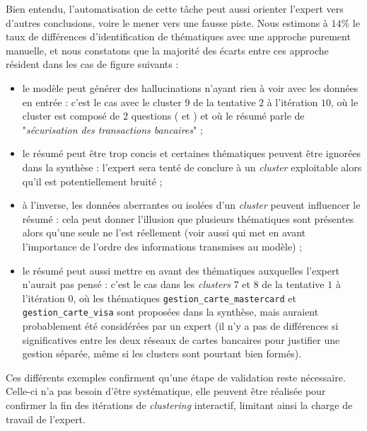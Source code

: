 			Bien entendu, l'automatisation de cette tâche peut aussi orienter l'expert vers d'autres conclusions, voire le mener vers une fausse piste.
			Nous estimons à $14$\% le taux de différences d'identification de thématiques avec une approche purement manuelle, et nous constatons que la majorité des écarts entre ces approche résident dans les cas de figure suivants :
			\begin{itemize}
				\item le modèle peut générer des hallucinations n'ayant rien à voir avec les données en entrée : c'est le cas avec le cluster $9$ de la tentative $2$ à l'itération $10$, où le cluster est composé de $2$ questions ( et ) et où le résumé parle de "\textit{sécurisation des transactions bancaires}" ;
				\item le résumé peut être trop concis et certaines thématiques peuvent être ignorées dans la synthèse : l'expert sera tenté de conclure à un \textit{cluster} exploitable alors qu'il est potentiellement bruité ;
				\item à l'inverse, les données aberrantes ou isolées d'un \textit{cluster} peuvent influencer le résumé : cela peut donner l'illusion que plusieurs thématiques sont présentes alors qu'une seule ne l'est réellement (voir aussi \cite{falke-etal:2019:ranking-generated-summaries} qui met en avant l'importance de l'ordre des informations transmises au modèle) ;
				\item le résumé peut aussi mettre en avant des thématiques auxquelles l'expert n'aurait pas pensé : c'est le cas dans les \textit{clusters} $7$ et $8$ de la tentative $1$ à l'itération $0$, où les thématiques \texttt{gestion\_carte\_mastercard} et \texttt{gestion\_carte\_visa} sont proposées dans la synthèse, mais auraient probablement été considérées par un expert (il n'y a pas de différences si significatives entre les deux réseaux de cartes bancaires pour justifier une gestion séparée, même si les clusters sont pourtant bien formés).
			\end{itemize}
			
			Ces différents exemples confirment qu'une étape de validation reste nécessaire.
			Celle-ci n'a pas besoin d'être systématique, elle peuvent être réalisée pour confirmer la fin des itérations de \textit{clustering} interactif, limitant ainsi la charge de travail de l'expert.
			
